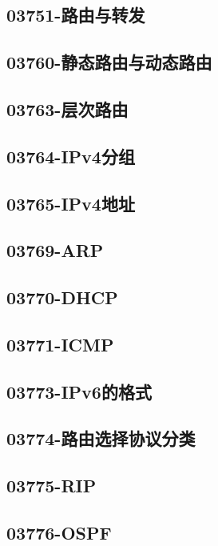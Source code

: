 \subsection{03751-路由与转发}

\subsection{03760-静态路由与动态路由}

\subsection{03763-层次路由}

\subsection{03764-IPv4分组}

\subsection{03765-IPv4地址}

\subsection{03769-ARP}

\subsection{03770-DHCP}

\subsection{03771-ICMP}

\subsection{03773-IPv6的格式}

\subsection{03774-路由选择协议分类}

\subsection{03775-RIP}

\subsection{03776-OSPF}

